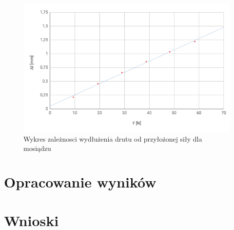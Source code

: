 \documentclass[a4paper,10pt,twoside]{article}
\begin{document}
\begin{figure}[!htp]
\centerline{\includegraphics[scale=0.65]{brass_wire.png}}
\caption{Wykres zależnosci wydłużenia drutu od przyłożonej siły dla mosiądzu}
\label{fig:tl}
\end{figure}

\section{Opracowanie wyników}

\section{Wnioski}
\end{document}
